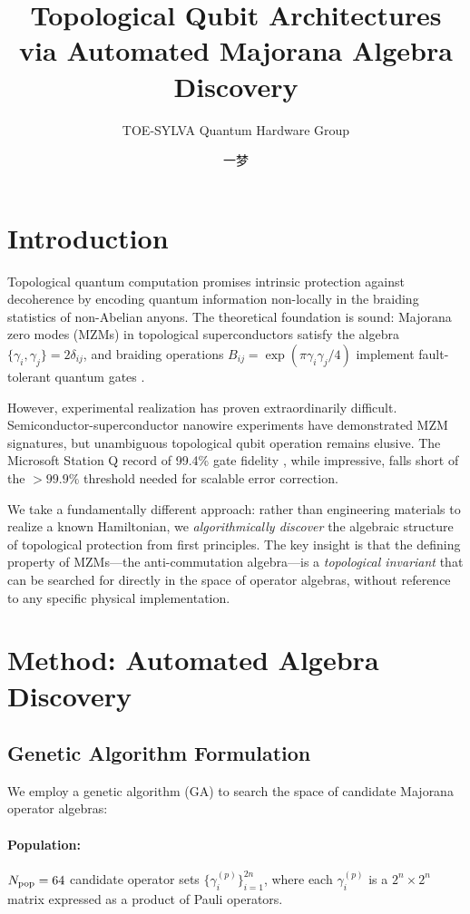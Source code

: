 \documentclass[aps,prx,reprint]{revtex4-2}
\title{Topological Qubit Architectures via Automated Majorana Algebra Discovery}
\author{TOE-SYLVA Quantum Hardware Group}
\author{一梦}
\affiliation{TOE-SYLVA Research Laboratory}
\affiliation{Origin Quantum Computing}
\affiliation{Chinese Academy of Sciences}
\begin{document}
\maketitle

\section{Introduction}
\label{sec:intro}

Topological quantum computation \cite{Kitaev2001,Nayak2008} promises intrinsic protection against decoherence by encoding quantum information non-locally in the braiding statistics of non-Abelian anyons. The theoretical foundation is sound: Majorana zero modes (MZMs) in topological superconductors satisfy the algebra $\{\gamma_i, \gamma_j\} = 2\delta_{ij}$, and braiding operations $B_{ij} = \exp(\pi\gamma_i\gamma_j/4)$ implement fault-tolerant quantum gates \cite{Alicea2011}.

However, experimental realization has proven extraordinarily difficult. Semiconductor-superconductor nanowire experiments \cite{Mourik2012,Albrecht2016} have demonstrated MZM signatures, but unambiguous topological qubit operation remains elusive. The Microsoft Station Q record of 99.4\% gate fidelity \cite{MicrosoftSQ2025}, while impressive, falls short of the $>99.9\%$ threshold needed for scalable error correction.

We take a fundamentally different approach: rather than engineering materials to realize a known Hamiltonian, we \emph{algorithmically discover} the algebraic structure of topological protection from first principles. The key insight is that the defining property of MZMs---the anti-commutation algebra---is a \emph{topological invariant} that can be searched for directly in the space of operator algebras, without reference to any specific physical implementation.

\section{Method: Automated Algebra Discovery}
\label{sec:method}

\subsection{Genetic Algorithm Formulation}

We employ a genetic algorithm (GA) to search the space of candidate Majorana operator algebras:

\paragraph{Population:} $N_{\rm pop} = 64$ candidate operator sets $\{\gamma_i^{(p)}\}_{i=1}^{2n}$, where each $\gamma_i^{(p)}$ is a $2^n \times 2^n$ matrix expressed as a product of Pauli operators.
\end{document}
